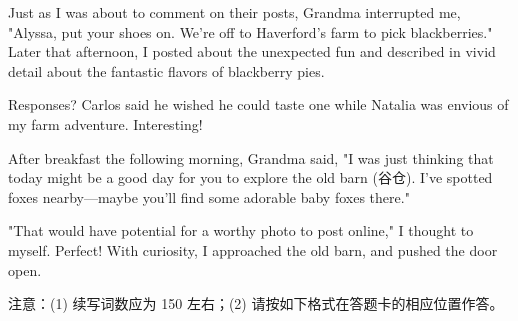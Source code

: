 \documentclass{英语试卷}
\begin{document}
\par Just as I was about to comment on their posts, Grandma interrupted me, "Alyssa, put your shoes on. We're off to Haverford's farm to pick blackberries." Later that afternoon, I posted about the unexpected fun and described in vivid detail about the fantastic flavors of blackberry pies.\par
\par Responses? Carlos said he wished he could taste one while Natalia was envious of my farm adventure. Interesting!\par
\par After breakfast the following morning, Grandma said, "I was just thinking that today might be a good day for you to explore the old barn (谷仓). I’ve spotted foxes nearby—maybe you’ll find some adorable baby foxes there."\par
\par "That would have potential for a worthy photo to post online," I thought to myself. Perfect! With curiosity, I approached the old barn, and pushed the door open.\par
\par 注意：(1) 续写词数应为 150 左右；(2) 请按如下格式在答题卡的相应位置作答。\par
{}
\end{document}

